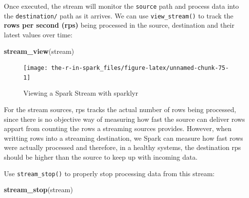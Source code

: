\documentclass[]{book}
\newenvironment{Shaded}{\begin{snugshade}}{\end{snugshade}}
\newcommand{\DataTypeTok}[1]{\textcolor[rgb]{0.13,0.29,0.53}{#1}}
\newcommand{\KeywordTok}[1]{\textcolor[rgb]{0.13,0.29,0.53}{\textbf{#1}}}
\newcommand{\NormalTok}[1]{#1}
\newcommand{\OperatorTok}[1]{\textcolor[rgb]{0.81,0.36,0.00}{\textbf{#1}}}
\newcommand{\StringTok}[1]{\textcolor[rgb]{0.31,0.60,0.02}{#1}}
\theoremstyle{definition}
\theoremstyle{definition}
\theoremstyle{definition}
\theoremstyle{remark}
\begin{document}
\begin{Shaded}
\end{Shaded}

Once executed, the stream will monitor the \texttt{source} path and
process data into the \texttt{destination/} path as it arrives. We can
use \texttt{view\_stream()} to track the \textbf{rows per second (rps)}
being processed in the source, destination and their latest values over
time:

\begin{Shaded}
\begin{Highlighting}[]
\KeywordTok{stream_view}\NormalTok{(stream)}
\end{Highlighting}
\end{Shaded}

\begin{figure}

{\centering \texttt{[image: the-r-in-spark\_files/figure-latex/unnamed-chunk-75-1]} 

}

\caption{Viewing a Spark Stream with sparklyr}\label{fig:unnamed-chunk-75}
\end{figure}

For the stream sources, rps tracks the actual number of rows being
processed, since there is no objective way of measuring how fast the
source can deliver rows appart from counting the rows a streaming
sources provides. However, when writting rows into a streaming
destination, we Spark can measure how fast rows were actually processed
and therefore, in a healthy systems, the destination rps should be
higher than the source to keep up with incoming data.

Use \texttt{stream\_stop()} to properly stop processing data from this
stream:

\begin{Shaded}
\begin{Highlighting}[]
\KeywordTok{stream_stop}\NormalTok{(stream)}
\end{Highlighting}
\end{Shaded}
\end{document}
